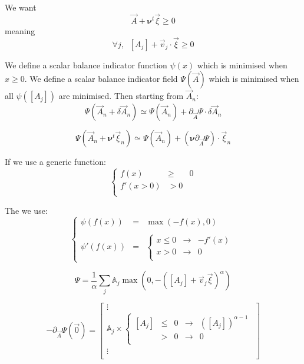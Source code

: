 \documentclass[aps,onecolumn,11pt]{revtex4}
\begin{document}
We want
\begin{equation}
	\vec{A} + \bm{\nu}^t \vec{\xi} \geq 0
\end{equation}
meaning
\begin{equation}
	\forall j, \;\; [A_j] + \vec{v}_j \cdot \vec{\xi} \geq 0
\end{equation}

We define a scalar balance indicator function $\psi(x)$ which is minimised when $x\geq0$.
We define a scalar balance indicator field $\Psi(\vec{A})$ 
which is minimised when all $\psi([A_j])$ are minimised.
Then starting from $\vec{A}_n$:
\begin{equation}
	\Psi(\vec{A}_n + \delta\vec{A}_n) \simeq \Psi(\vec{A}_n) + \partial_{\vec{A}} \Psi \cdot \delta\vec{A}_n
\end{equation}

\begin{equation}
	\Psi(\vec{A}_n + \bm{\nu}^t \vec{\xi}_n) \simeq \Psi(\vec{A}_n) + (\bm{\nu} \partial_{\vec{A}} \Psi) \cdot  \vec{\xi}_n
\end{equation}

If we use a generic function:
\begin{equation}
\left \lbrace
\begin{array}{rcl}
	f(x)      & \geq &0\\
	f'(x>0)   &> 0 \\
\end{array}
\right.
\end{equation}

The we use:
\begin{equation}
\left\lbrace
\begin{array}{rcl}
	\psi( f(x) ) &= &\max(-f(x),0)\\
	\\
	\psi'( f(x) ) & = &
	\left\lbrace
	\begin{array}{rcl}
		x\leq0 & \to & -f'(x)\\
		x>0    & \to & 0\\
	\end{array}
	\right.
\end{array}
\right.
\end{equation}

\begin{equation}
	\Psi = \dfrac{1}{\alpha}\sum_j \mathbb{A}_j \max(0,-([A_j]+\vec{v}_j \vec{\xi})^\alpha)
\end{equation}

\begin{equation}
	-\partial_{\vec{A}} \Psi (\vec{0}) = 
	\begin{bmatrix}
	\vdots \\
	\mathbb{A}_j \times
	\left\lbrace
	\begin{array}{rclcl}
	[A_j] & \leq & 0 & \to & ([A_j])^{\alpha-1} \\
	[A_j] & >    & 0 & \to & 0 \\
	\end{array}
	\right.
	 \\
	\vdots\\
	\end{bmatrix}
\end{equation}
 
\end{document}
